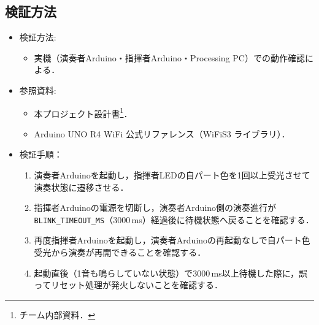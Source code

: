 \documentclass[lualatex,paper=a4paper,jafontsize=11.5pt,jafontscale=1.05]{jlreq}
\begin{document}
\subsection{検証方法}
\begin{itemize}
  \item 検証方法:
  \begin{itemize}
      \item 実機（演奏者Arduino・指揮者Arduino・Processing PC）での動作確認による．
  \end{itemize}
  \item 参照資料:
  \begin{itemize}
      \item 本プロジェクト設計書\footnote{チーム内部資料．}．
      \item Arduino UNO R4 WiFi 公式リファレンス（WiFiS3 ライブラリ）\cite{wifis3}．
  \end{itemize}
  \item 検証手順：
  \begin{enumerate}
      \item 演奏者Arduinoを起動し，指揮者LEDの自パート色を1回以上受光させて演奏状態に遷移させる．
      \item 指揮者Arduinoの電源を切断し，演奏者Arduino側の演奏進行が \texttt{BLINK\_TIMEOUT\_MS}（3000\,ms）経過後に待機状態へ戻ることを確認する．
      \item 再度指揮者Arduinoを起動し，演奏者Arduinoの再起動なしで自パート色受光から演奏が再開できることを確認する．
      \item 起動直後（1音も鳴らしていない状態）で3000\,ms以上待機した際に，誤ってリセット処理が発火しないことを確認する．
  \end{enumerate}
\end{itemize}
\end{document}
